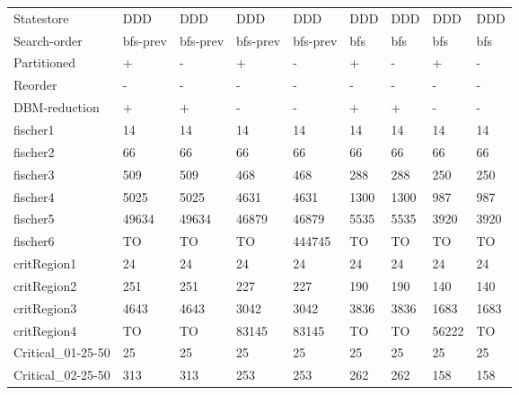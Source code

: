 \begin{table}
\label{fig:nodes_1}
\begin{adjustbox}{max totalheight=\textheight}
    \begin{tabular}{|l|llllllll|}
    \hline
     Statestore        & DDD      & DDD      & DDD      & DDD      & DDD   & DDD   & DDD   & DDD   \\
    Search-order       & bfs-prev & bfs-prev & bfs-prev & bfs-prev & bfs   & bfs   & bfs   & bfs   \\
    Partitioned        & +        & -        & +        & -        & +     & -     & +     & -     \\
    Reorder            & -        & -        & -        & -        & -     & -     & -     & -     \\
    DBM-reduction      & +        & +        & -        & -        & +     & +     & -     & -     \\ \hline
    fischer1           & 14       & 14       & 14       & 14       & 14    & 14    & 14    & 14    \\
    fischer2           & 66       & 66       & 66       & 66       & 66    & 66    & 66    & 66    \\
    fischer3           & 509      & 509      & 468      & 468      & 288   & 288   & 250   & 250   \\
    fischer4           & 5025     & 5025     & 4631     & 4631     & 1300  & 1300  & 987   & 987   \\
    fischer5           & 49634    & 49634    & 46879    & 46879    & 5535  & 5535  & 3920  & 3920  \\
    fischer6           & TO       & TO       & TO       & 444745   & TO    & TO    & TO    & TO    \\ \hline
    critRegion1        & 24       & 24       & 24       & 24       & 24    & 24    & 24    & 24    \\
    critRegion2        & 251      & 251      & 227      & 227      & 190   & 190   & 140   & 140   \\
    critRegion3        & 4643     & 4643     & 3042     & 3042     & 3836  & 3836  & 1683  & 1683  \\
    critRegion4        & TO       & TO       & 83145    & 83145    & TO    & TO    & 56222 & TO    \\ \hline
    Critical\_01-25-50 & 25       & 25       & 25       & 25       & 25    & 25    & 25    & 25    \\
    Critical\_02-25-50 & 313      & 313      & 253      & 253      & 262   & 262   & 158   & 158   \\

\end{tabular}
\end{adjustbox}
\end{table}
